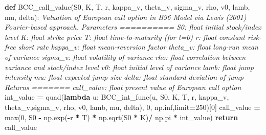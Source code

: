 \documentclass[
]{book}
\newenvironment{Shaded}{\begin{snugshade}}{\end{snugshade}}
\newcommand{\BuiltInTok}[1]{#1}
\newcommand{\CommentTok}[1]{\textcolor[rgb]{0.56,0.35,0.01}{\textit{#1}}}
\newcommand{\ControlFlowTok}[1]{\textcolor[rgb]{0.13,0.29,0.53}{\textbf{#1}}}
\newcommand{\DecValTok}[1]{\textcolor[rgb]{0.00,0.00,0.81}{#1}}
\newcommand{\KeywordTok}[1]{\textcolor[rgb]{0.13,0.29,0.53}{\textbf{#1}}}
\newcommand{\NormalTok}[1]{#1}
\newcommand{\OperatorTok}[1]{\textcolor[rgb]{0.81,0.36,0.00}{\textbf{#1}}}
\begin{document}
\begin{Shaded}
\begin{Highlighting}[]
\KeywordTok{def}\NormalTok{ BCC\_call\_value(S0, K, T, r, kappa\_v, theta\_v, sigma\_v, rho, v0, lamb, mu, delta):}
  \CommentTok{\textquotesingle{}\textquotesingle{}\textquotesingle{} Valuation of European call option in B96 Model via Lewis (2001)}
\CommentTok{  Fourier{-}based approach.}
\CommentTok{  Parameters}
\CommentTok{  ==========}
\CommentTok{  S0: float}
\CommentTok{  initial stock/index level}
\CommentTok{  K: float}
\CommentTok{  strike price}
\CommentTok{  T: float}
\CommentTok{  time{-}to{-}maturity (for t=0)}
\CommentTok{  r: float}
\CommentTok{  constant risk{-}free short rate}
\CommentTok{  kappa\_v: float}
\CommentTok{  mean{-}reversion factor}
\CommentTok{  theta\_v: float}
\CommentTok{  long{-}run mean of variance}
\CommentTok{  sigma\_v: float}
\CommentTok{  volatility of variance}
\CommentTok{  rho: float}
\CommentTok{  correlation between variance and stock/index level}
\CommentTok{  v0: float}
\CommentTok{  initial level of variance}
\CommentTok{  lamb: float}
\CommentTok{  jump intensity}
\CommentTok{  mu: float}
\CommentTok{  expected jump size}
\CommentTok{  delta: float}
\CommentTok{  standard deviation of jump}
\CommentTok{  Returns}
\CommentTok{  =======}
\CommentTok{  call\_value: float}
\CommentTok{  present value of European call option}
\CommentTok{  \textquotesingle{}\textquotesingle{}\textquotesingle{}}
\NormalTok{  int\_value }\OperatorTok{=}\NormalTok{ quad(}\KeywordTok{lambda}\NormalTok{ u: BCC\_int\_func(u, S0, K, T, r, kappa\_v, theta\_v,sigma\_v, rho, v0, lamb, mu, delta), }\DecValTok{0}\NormalTok{, np.inf,limit}\OperatorTok{=}\DecValTok{250}\NormalTok{)[}\DecValTok{0}\NormalTok{]}
\NormalTok{  call\_value }\OperatorTok{=} \BuiltInTok{max}\NormalTok{(}\DecValTok{0}\NormalTok{, S0 }\OperatorTok{{-}}\NormalTok{ np.exp(}\OperatorTok{{-}}\NormalTok{r }\OperatorTok{*}\NormalTok{ T) }\OperatorTok{*}\NormalTok{ np.sqrt(S0 }\OperatorTok{*}\NormalTok{ K)}\OperatorTok{/}\NormalTok{ np.pi }\OperatorTok{*}\NormalTok{ int\_value)}
  \ControlFlowTok{return}\NormalTok{ call\_value}


\end{Highlighting}
\end{Shaded}
\end{document}
